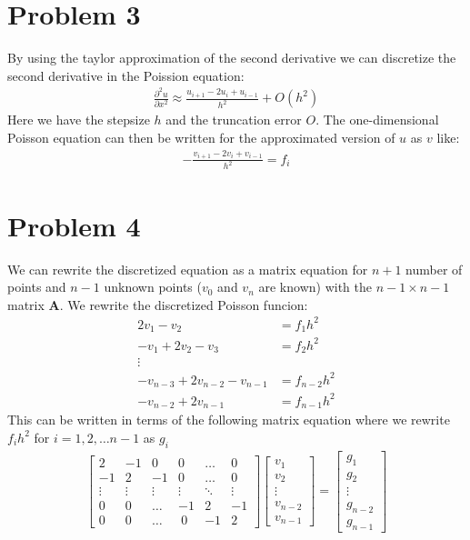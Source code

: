 \documentclass[english,notitlepage]{revtex4-1}  %
\begin{document}
\section*{Problem 3}
By using the taylor approximation of the second derivative we can discretize the second derivative in the Poission equation:
\begin{align*}
  \frac{\partial^2 u }{\partial x^2} \approx \frac{u_{i+1} - 2 u_i + u_{i-1}}{h^2} + O(h^2)
\end{align*}
Here we have the stepsize $h$ and the truncation error $O$. The one-dimensional Poisson equation can then be written for the approximated version of $u$ as $v$ like:
\begin{align}
    -\frac{v_{i+1} - 2 v_i + v_{i-1}}{h^2} = f_i
    \label{eq:poiss_disc}
\end{align}

\section*{Problem 4}
We can rewrite the discretized equation as a matrix equation for $n+1$ number of points and $n-1$ unknown points ($v_0$ and $v_n$ are known) with the $n-1\times n-1$ matrix $\boldsymbol{A}$. We rewrite the discretized Poisson funcion:
\begin{align*}
  2 v_1- v_2 &= f_1 h^2\\
  -v_{1} +2 v_2 - v_{3} &= f_2 h^2 \\
    \vdots \\
  -v_{n-3} + 2 v_{n-2} - v_{n-1} &= f_{n-2} h^2\\
  - v_{n-2} + 2 v_{n-1}  &= f_{n-1} h^2
\end{align*}
This can be written in terms of the following matrix equation where we rewrite $f_i h^2$ for $i = 1,2,\dots n-1$ as $g_i$
\begin{align*}
  \begin{bmatrix}
    2 & -1 & 0 & 0 & \dots &0 \\
    -1 & 2 & -1 & 0 &\dots& 0 \\
    \vdots & \vdots & \vdots & \vdots & \ddots & \vdots\\
    0 & 0 & \dots & -1 & 2 & -1 \\
    0 & 0 & \dots & \ 0 &-1 & 2
  \end{bmatrix}
  \begin{bmatrix}
    v_1 \\
    v_2 \\
    \vdots\\
    v_{n-2}\\
    v_{n-1}
  \end{bmatrix}
  =
  \begin{bmatrix}
    g_1 \\
    g_2 \\
    \vdots\\
    g_{n-2}\\
    g_{n-1}
  \end{bmatrix}
\end{align*}
\end{document}
